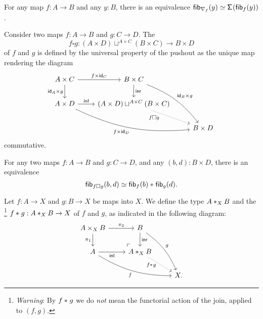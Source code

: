 \begin{prp}
For any map $f:A\to B$ and any $y:B$, there is an equivalence $\eqv{\fib{\nabla_f}{y}}{\susp(\fib{f}{y})}$. 
\end{prp}

\begin{defn}
Consider two maps $f:A\to B$ and $g:C\to D$.
The 
\begin{equation*}
f\square g : (A\times D)\sqcup^{A\times C} (B\times C)\to B\times D
\end{equation*}
of $f$ and $g$ is defined by the universal property of the pushout as the unique map rendering the diagram
\begin{equation*}
\begin{tikzcd}
A\times C \arrow[r,"{f\times \idfunc[C]}"] \arrow[d,swap,"{\idfunc[A]\times g}"] & B\times C \arrow[d,"\inr"] \arrow[ddr,bend left=15,"{\idfunc[B]\times g}"] \\
A\times D \arrow[r,"\inl"] \arrow[drr,bend right=15,swap,"{f\times\idfunc[D]}"] & (A\times D)\sqcup^{A\times C} (B\times C) \arrow[dr,densely dotted,swap,near start,"f\square g"] \\
& & B\times D
\end{tikzcd}
\end{equation*}
commutative.
\end{defn}

\begin{prp}
For any two maps $f:A\to B$ and $g:C\to D$, and any $(b,d):B\times D$, there is an equivalence
\begin{equation*}
\eqv{\fib{f\square g}{b,d}}{\join{\fib{f}{b}}{\fib{g}{d}}}.
\end{equation*}
\end{prp}

\begin{defn}
Let $f:A\to X$ and $g:B\to X$ be maps into $X$. We define the type $\join[X]{A}{B}$ and the \footnote{\emph{Warning}: By $\join{f}{g}$ we do \emph{not} mean the functorial action of the
join, applied to $(f,g)$.} $\join{f}{g}:\join[X]{A}{B}\to X$ of
$f$ and $g$, as indicated in the following diagram:
\begin{equation*}
\begin{tikzcd}
A\times_X B \arrow[r,"\pi_2"] \arrow[d,swap,"\pi_1"] \arrow[dr, phantom, "{\ulcorner}", at end] & B \arrow[d,"\inr"] \arrow[ddr,bend left=15,"g"] \\
A \arrow[r,swap,"\inl"] \arrow[drr,bend right=15,swap,"f"] & \join[X]{A}{B} \arrow[dr,densely dotted,swap,near start,"\join{f}{g}" xshift=1ex] \\
& & X.
\end{tikzcd}
\end{equation*}
\end{defn}

